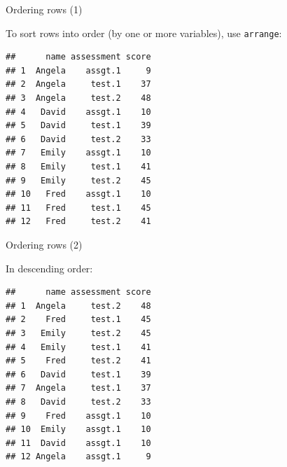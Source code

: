\begin{frame}[fragile]{Ordering rows (1)}
  
To sort rows into order (by one or more variables), use \texttt{arrange}:

{\small
\begin{knitrout}
\color{fgcolor}\begin{kframe}
\begin{alltt}
\end{alltt}
\begin{verbatim}
##      name assessment score
## 1  Angela    assgt.1     9
## 2  Angela     test.1    37
## 3  Angela     test.2    48
## 4   David    assgt.1    10
## 5   David     test.1    39
## 6   David     test.2    33
## 7   Emily    assgt.1    10
## 8   Emily     test.1    41
## 9   Emily     test.2    45
## 10   Fred    assgt.1    10
## 11   Fred     test.1    45
## 12   Fred     test.2    41
\end{verbatim}
\end{kframe}
\end{knitrout}
}
  
\end{frame}

\begin{frame}[fragile]{Ordering rows (2)}
  
In descending order:

{\small
\begin{knitrout}
\color{fgcolor}\begin{kframe}
\begin{alltt}
\end{alltt}
\begin{verbatim}
##      name assessment score
## 1  Angela     test.2    48
## 2    Fred     test.1    45
## 3   Emily     test.2    45
## 4   Emily     test.1    41
## 5    Fred     test.2    41
## 6   David     test.1    39
## 7  Angela     test.1    37
## 8   David     test.2    33
## 9    Fred    assgt.1    10
## 10  Emily    assgt.1    10
## 11  David    assgt.1    10
## 12 Angela    assgt.1     9
\end{verbatim}
\end{kframe}
\end{knitrout}
}
  
\end{frame}


